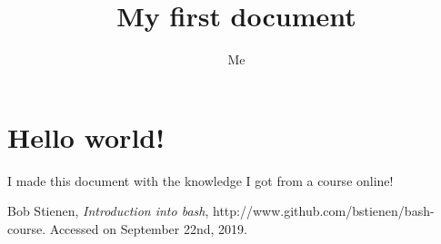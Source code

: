 \documentclass{article}
\title{My first document}
\author{Me}
\begin{document}
\maketitle

\section{Hello world!}
I made this document with the knowledge I got from a course\cite{bash-course} online!

\begin{thebibliography}{9}

  Bob Stienen,
  \textit{Introduction into bash},
  http://www.github.com/bstienen/bash-course.
  Accessed on September 22nd, 2019.
\end{thebibliography}
\end{document}
